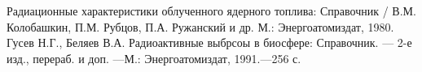 \begin{thebibliography}{9}
	 Радиационные характеристики облученного ядерного топлива: Справочник / В.М. Колобашкин, П.М. Рубцов, П.А. Ружанский и др. М.: Энергоатомиздат, 1980.
	 Гусев Н.Г., Беляев В.А. Радиоактивные выбрсоы в биосфере: Справочник. --- 2-е изд., перераб. и доп.
	---М.: Энергоатомиздат, 1991.---256 с.
\end{thebibliography}